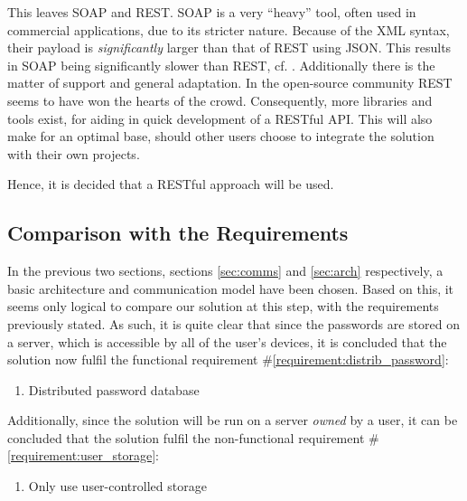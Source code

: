 			This leaves SOAP and REST. SOAP is a very ``heavy'' tool, often used in commercial applications, due to its stricter nature. Because of the XML syntax, their payload is \emph{significantly} larger than that of REST using JSON. This results in SOAP being significantly slower than REST, cf. \cite{soap_vs_rest}. Additionally there is the matter of support and general adaptation. In the open-source community REST seems to have won the hearts of the crowd. Consequently, more libraries and tools exist, for aiding in quick development of a RESTful API. This will also make for an optimal base, should other users choose to integrate the solution with their own projects.




			Hence, it is decided that a RESTful approach will be used. 

		\subsection{Comparison with the Requirements}
			\label{requirement:fulfilled:distrib_password}
			\label{requirement:fulfilled:user_storage}

			In the previous two sections, sections \ref{sec:comms} and \ref{sec:arch} respectively, a basic architecture and communication model have been chosen. Based on this, it seems only logical to compare our solution at this step, with the requirements previously stated. As such, it is quite clear that since the passwords are stored on a server, which is accessible by all of the user's devices, it is concluded that the solution now fulfil the functional requirement \#\ref{requirement:distrib_password}:

			\vspace{-3ex}\begin{enumerate}
				\setlength\itemsep{0.1em}
				\item Distributed password database
			\end{enumerate}

			Additionally, since the solution will be run on a server \emph{owned} by a user, it can be concluded that the solution fulfil the non-functional requirement \#\ref{requirement:user_storage}:
			\vspace{-3ex}\begin{enumerate}
				\setlength\itemsep{0.1em}
				\item Only use user-controlled storage
			\end{enumerate}

